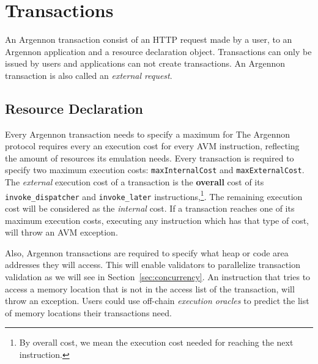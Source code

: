 

\section{Transactions}\label{sec:transactions}

An Argennon transaction consist of an HTTP request made by a user, to an Argennon application and a resource
declaration object. Transactions can only be
issued by users and applications can not create transactions. An Argennon transaction is also called
an \emph{external request}.

\subsection{Resource Declaration}\label{subsec:resource-declaration}

Every Argennon transaction needs to specify a maximum for
The Argennon protocol requires every  an execution cost for
every AVM instruction, reflecting the amount of resources its emulation needs. Every
transaction is required to specify two maximum execution costs: \texttt{maxInternalCost}
and \texttt{maxExternalCost}. The \emph{external} execution cost of a transaction is the \textbf{overall} cost of its
\texttt{invoke\_dispatcher} and \texttt{invoke\_later} instructions,\footnote{By overall cost, we mean the execution
cost needed for reaching the next instruction.}. The remaining execution cost will be considered as
the \emph{internal} cost. If a transaction reaches one of its maximum execution costs, executing any instruction
which has that type of cost, will throw an AVM exception.


Also, Argennon transactions are required to specify what heap or code area addresses they will access. This will
enable validators to parallelize transaction validation as we will see in Section~\ref{sec:concurrency}. An instruction
that tries to access a memory location that is not in the access list of the transaction, will throw an exception.
Users could use off-chain \emph{execution oracles} to predict the list of memory locations their transactions need.

